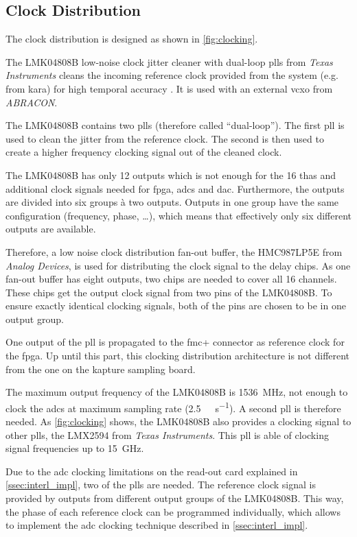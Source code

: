 \subsection{Clock Distribution}
The clock distribution is designed as shown in \autoref{fig:clocking}.

The LMK04808B low-noise clock jitter cleaner with dual-loop \glspl{pll} from \textit{Texas Instruments} cleans the incoming reference clock provided from the system (e.g. from \gls{kara}) for high temporal accuracy \cite{caselle2013}.
It is used with an external \gls{vcxo} from \textit{ABRACON}. 

The LMK04808B contains two \glspl{pll} (therefore called ``dual-loop''). 
The first \gls{pll} is used to clean the jitter from the reference clock. 
The second is then used to create a higher frequency clocking signal out of the cleaned clock. 

The LMK04808B has only 12 outputs which is not enough for the 16 \glspl{tha} and additional clock signals needed for \gls{fpga}, \glspl{adc} and \gls{dac}. Furthermore, the outputs are divided into six groups à two outputs. 
Outputs in one group have the same configuration (frequency, phase, \ldots), which means that effectively only six different outputs are available.

Therefore, a low noise clock distribution fan-out buffer, the HMC987LP5E from \textit{Analog Devices}, is used for distributing the clock signal to the delay chips.
As one fan-out buffer has eight outputs, two chips are needed to cover all 16 channels. These chips get the output clock signal from two pins of the LMK04808B.
To ensure exactly identical clocking signals, both of the pins are chosen to be in one output group.

One output of the \gls{pll} is propagated to the \gls{fmc}+ connector as reference clock for the \gls{fpga}.
Up until this part, this clocking distribution architecture is not different from the one on the \gls{kapture} sampling board.

The maximum output frequency of the LMK04808B is \SI{1536}{\mega \hertz}, not enough to clock the \glspl{adc} at maximum sampling rate (\SI{2.5}{\giga \sample \per \second}). 
A second \gls{pll} is therefore needed. 
As \autoref{fig:clocking} shows, the LMK04808B also provides a clocking signal to other \glspl{pll}, the LMX2594 from \textit{Texas Instruments}.
This \gls{pll} is able of clocking signal frequencies up to \SI{15}{\giga \hertz}.

Due to the \gls{adc} clocking limitations on the read-out card explained in \autoref{ssec:interl_impl}, two of the \glspl{pll} are needed. 
The reference clock signal is provided by outputs from different output groups of the LMK04808B. This way, the phase of each reference clock can be programmed individually, which allows to implement the \gls{adc} clocking technique described in \autoref{ssec:interl_impl}.


